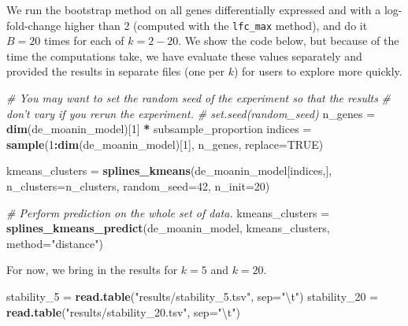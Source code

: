 \documentclass[9pt,a4paper,]{extarticle}
\newenvironment{Shaded}{\begin{snugshade}}{\end{snugshade}}
\newcommand{\CharTok}[1]{\textcolor[rgb]{0.31,0.60,0.02}{#1}}
\newcommand{\CommentTok}[1]{\textcolor[rgb]{0.56,0.35,0.01}{\textit{#1}}}
\newcommand{\DataTypeTok}[1]{\textcolor[rgb]{0.13,0.29,0.53}{#1}}
\newcommand{\DecValTok}[1]{\textcolor[rgb]{0.00,0.00,0.81}{#1}}
\newcommand{\KeywordTok}[1]{\textcolor[rgb]{0.13,0.29,0.53}{\textbf{#1}}}
\newcommand{\NormalTok}[1]{#1}
\newcommand{\OperatorTok}[1]{\textcolor[rgb]{0.81,0.36,0.00}{\textbf{#1}}}
\newcommand{\OtherTok}[1]{\textcolor[rgb]{0.56,0.35,0.01}{#1}}
\newcommand{\StringTok}[1]{\textcolor[rgb]{0.31,0.60,0.02}{#1}}
\begin{document}
We run the bootstrap method on all genes differentially expressed and with a
log-fold-change higher than 2 (computed with the \texttt{lfc\_max} method), and do it
\(B=20\) times for each of \(k=2-20\). We show the code below, but because of the
time the computations take, we have evaluate these values separately and provided the
results in separate files (one per \(k\)) for users to explore more quickly.

\begin{Shaded}
\begin{Highlighting}[]
\CommentTok{# You may want to set the random seed of the experiment so that the results}
\CommentTok{# don't vary if you rerun the experiment.}
\CommentTok{# set.seed(random_seed)}
\NormalTok{n_genes =}\StringTok{ }\KeywordTok{dim}\NormalTok{(de_moanin_model)[}\DecValTok{1}\NormalTok{] }\OperatorTok{*}\StringTok{ }\NormalTok{subsample_proportion}
\NormalTok{indices =}\StringTok{ }\KeywordTok{sample}\NormalTok{(}\DecValTok{1}\OperatorTok{:}\KeywordTok{dim}\NormalTok{(de_moanin_model)[}\DecValTok{1}\NormalTok{], n_genes, }\DataTypeTok{replace=}\OtherTok{TRUE}\NormalTok{)}

\NormalTok{kmeans_clusters =}\StringTok{ }\KeywordTok{splines_kmeans}\NormalTok{(de_moanin_model[indices,],}
    \DataTypeTok{n_clusters=}\NormalTok{n_clusters,}
    \DataTypeTok{random_seed=}\DecValTok{42}\NormalTok{,}
    \DataTypeTok{n_init=}\DecValTok{20}\NormalTok{)}

\CommentTok{# Perform prediction on the whole set of data.}
\NormalTok{kmeans_clusters =}\StringTok{ }\KeywordTok{splines_kmeans_predict}\NormalTok{(de_moanin_model, kmeans_clusters, }
    \DataTypeTok{method=}\StringTok{"distance"}\NormalTok{)}
\end{Highlighting}
\end{Shaded}

For now, we bring in the results for \(k=5\) and \(k=20\).

\begin{Shaded}
\begin{Highlighting}[]
\NormalTok{stability_}\DecValTok{5}\NormalTok{ =}\StringTok{ }\KeywordTok{read.table}\NormalTok{(}\StringTok{"results/stability_5.tsv"}\NormalTok{, }\DataTypeTok{sep=}\StringTok{"}\CharTok{\textbackslash{}t}\StringTok{"}\NormalTok{)}
\NormalTok{stability_}\DecValTok{20}\NormalTok{ =}\StringTok{ }\KeywordTok{read.table}\NormalTok{(}\StringTok{"results/stability_20.tsv"}\NormalTok{, }\DataTypeTok{sep=}\StringTok{"}\CharTok{\textbackslash{}t}\StringTok{"}\NormalTok{)}
\end{Highlighting}
\end{Shaded}
\end{document}
